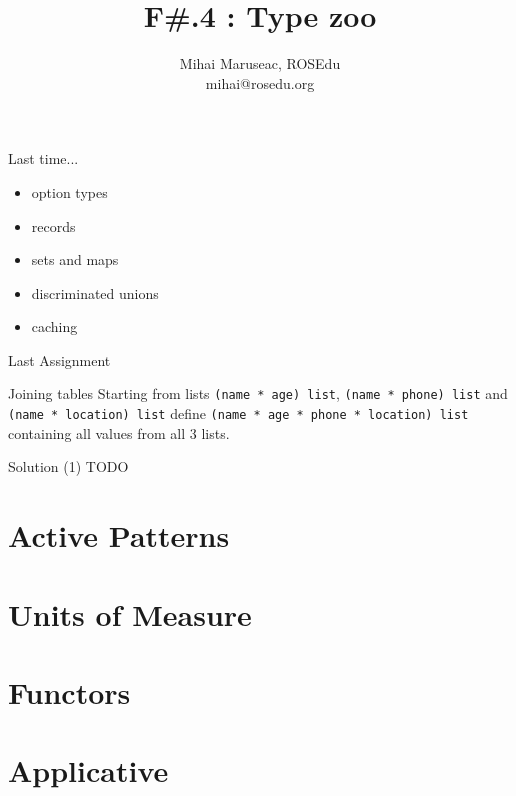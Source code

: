 \documentclass{beamer}
\title{F\#.4 : Type zoo}
\author{Mihai Maruseac, ROSEdu\\mihai@rosedu.org}
\begin{document}
\maketitle

\begin{frame}
  \tableofcontents
\end{frame}

\begin{frame}{Last time...}
  \begin{itemize}[<+->]
    \item option types
    \item records
    \item sets and maps
    \item discriminated unions
    \item caching
  \end{itemize}
\end{frame}

\begin{frame}{Last Assignment}
  \begin{block}{Joining tables}
  Starting from lists \texttt{(name * age) list}, \texttt{(name * phone) list}
and \texttt{(name * location) list} define \texttt{(name * age * phone *
location) list} containing all values from all 3 lists.
  \end{block}
\end{frame}

\begin{frame}[fragile]{Solution (1)}
  TODO
\end{frame}

\section{Active Patterns}
\frame{\tableofcontents[currentsection]}

\section{Units of Measure}
\frame{\tableofcontents[currentsection]}

\section{Functors}
\frame{\tableofcontents[currentsection]}

\section{Applicative}
\frame{\tableofcontents[currentsection]}
\end{document}

